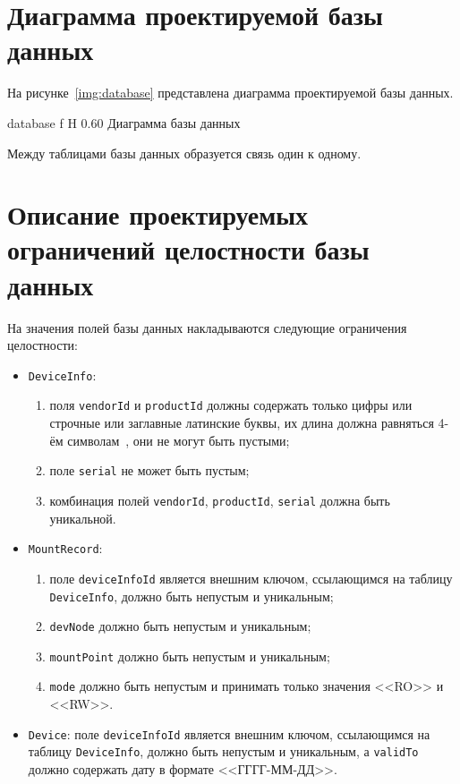\section{Диаграмма проектируемой базы данных}

На рисунке~\ref{img:database} представлена диаграмма проектируемой базы данных.

    {database}
    {f}
    {H}
    {0.60\textwidth}
    {Диаграмма базы данных}

Между таблицами базы данных образуется связь один к одному.

\section{Описание проектируемых ограничений целостности базы данных}

На значения полей базы данных накладываются следующие ограничения целостности:

\begin{itemize}[label=---]
    \item \texttt{DeviceInfo}:
    \begin{enumerate}
        \item поля \texttt{vendorId} и \texttt{productId} должны содержать только цифры или строчные или 
        заглавные латинские буквы, их длина должна равняться 4-ём символам~\cite{USBstandart}, они не могут быть пустыми;
        \item поле \texttt{serial} не может быть пустым;
        \item комбинация полей \texttt{vendorId}, \texttt{productId}, \texttt{serial} должна быть уникальной.
    \end{enumerate}
    \item \texttt{MountRecord}:
    \begin{enumerate}
        \item поле \texttt{deviceInfoId} является внешним ключом, ссылающимся на таблицу \texttt{DeviceInfo}, должно быть непустым и уникальным;
        \item \texttt{devNode} должно быть непустым и уникальным;
        \item \texttt{mountPoint} должно быть непустым и уникальным;
        \item \texttt{mode} должно быть непустым и принимать только значения <<RO>> и <<RW>>.
    \end{enumerate}
    \item \texttt{Device}: поле \texttt{deviceInfoId} является внешним ключом, ссылающимся на таблицу \texttt{DeviceInfo}, должно быть непустым и 
    уникальным, а \texttt{validTo} должно содержать дату в формате <<ГГГГ-ММ-ДД>>.
\end{itemize}